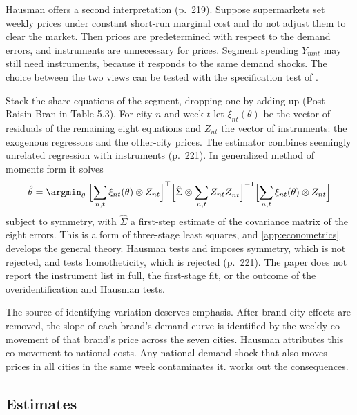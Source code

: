Hausman offers a second interpretation (p.~219). Suppose supermarkets set weekly prices under constant
short-run marginal cost and do not adjust them to clear the market. Then prices are predetermined with
respect to the demand errors, and instruments are unnecessary for prices. Segment spending $Y_{mnt}$ may still
need instruments, because it responds to the same demand shocks. The choice between the two views can be
tested with the specification test of \citet{Hausman1978}.

Stack the share equations of the segment, dropping one by adding up (Post Raisin Bran in Table 5.3). For
city $n$ and week $t$ let $\xi_{nt}(\theta)$ be the vector of residuals of the remaining eight equations and
$Z_{nt}$ the vector of instruments: the exogenous regressors and the other-city prices. The estimator
combines seemingly unrelated regression with instruments (p.~221). In generalized method of moments form it
solves
\begin{equation}\label{eq:10-h-gmm}
  \hat\theta = \argmin_{\theta}\;
  \Bigl[\sum_{n,t}\xi_{nt}(\theta)\otimes Z_{nt}\Bigr]^\top
  \Bigl[\hat\Sigma\otimes\sum_{n,t}Z_{nt}Z_{nt}^\top\Bigr]^{-1}
  \Bigl[\sum_{n,t}\xi_{nt}(\theta)\otimes Z_{nt}\Bigr]
\end{equation}
subject to symmetry, with $\hat\Sigma$ a first-step estimate of the covariance matrix of the eight errors.
This is a form of three-stage least squares, and \cref{app:econometrics} develops the general theory. Hausman tests
and imposes symmetry, which is not rejected, and tests homotheticity, which is rejected (p.~221). The
paper does not report the instrument list in full, the first-stage fit, or the outcome of the
overidentification and Hausman tests.

The source of identifying variation deserves emphasis. After brand-city effects are removed, the slope of
each brand's demand curve is identified by the weekly co-movement of that brand's price across the seven
cities. Hausman attributes this co-movement to national costs. Any national demand shock that also moves
prices in all cities in the same week contaminates it.  works out the consequences.

\subsection{Estimates}\label{sec:10-hausman-estimates}

